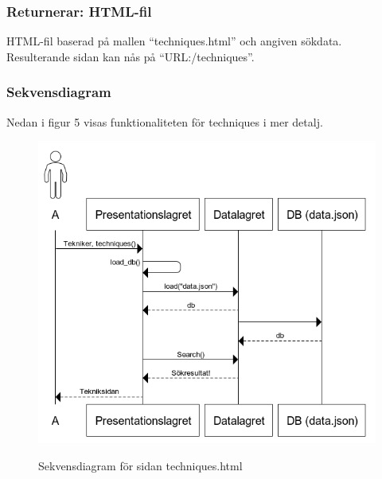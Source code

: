 \documentclass{TDP003mall}
\begin{document}
\subsubsection*{Returnerar: HTML-fil}
HTML-fil baserad på mallen ``techniques.html'' och angiven sökdata. Resulterande sidan kan nås på ``URL:/techniques''.
\subsubsection*{Sekvensdiagram}
Nedan i figur 5 visas funktionaliteten för techniques i mer detalj.
\begin{figure}[!h]
  \centering
  \includegraphics[scale=0.5]{tekniker.png}
  \label{Bild 5}
  \caption{Sekvensdiagram för sidan techniques.html}
\end{figure}
\end{document}
